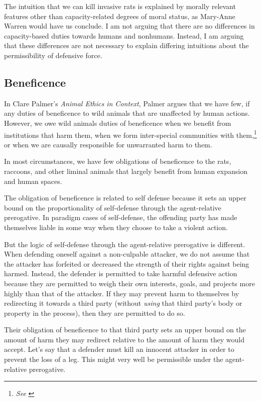 	The intuition that we can kill invasive rats is explained by morally relevant
	features other than capacity-related degrees of moral status, as
	Mary-Anne Warren would have us conclude.  I am not arguing that there are
	no differences in capacity-based duties towards humans and nonhumans.
	Instead, I am arguing that these differences are not necessary to explain
	differing intuitions about the permissibility of defensive
	force.
	\subsection{Beneficence}

		In Clare Palmer’s \emph{Animal Ethics in Context}, Palmer argues that
		we have few, if any duties of beneficence to wild animals that are
		unaffected by human actions. However, we owe wild animals duties of
		beneficence when we benefit from institutions that harm them, when we
		form inter-special communities with them,\footnote{\emph{See} \cite{gabardi}} or when
		we are causally responsible for unwarranted harm to them.

		In most circumstances, we have few obligations of beneficence to the
		rats, raccoons, and other liminal animals that largely benefit from
		human expansion and human spaces.

		The obligation of beneficence is related to self defense because it sets
		an upper bound on the proportionality of self-defense through the
		agent-relative prerogative. In paradigm cases of self-defense, the
		offending party has made themselves liable in some way when they choose
		to take a violent action.

		But the logic of self-defense through the agent-relative prerogative is
		different. When defending oneself against a non-culpable attacker, we do
		not assume that the attacker has forfeited or decreased the strength
		of their rights against being harmed. Instead, the defender is
		permitted to take harmful defensive action because they are permitted
		to weigh their own interests, goals, and projects more highly than that
		of the attacker. If they may prevent harm to themselves by redirecting
		it towards a third party (without \emph{using} that third party’s body
		or property in the process), then they are permitted to do so.

		Their obligation of beneficence to that third party sets an upper bound
		on the amount of harm they may redirect relative to the amount of harm
		they would accept. Let’s say that a defender must kill an innocent
		attacker in order to prevent the loss of a leg. This might very well
		be permissible under the agent-relative prerogative.

